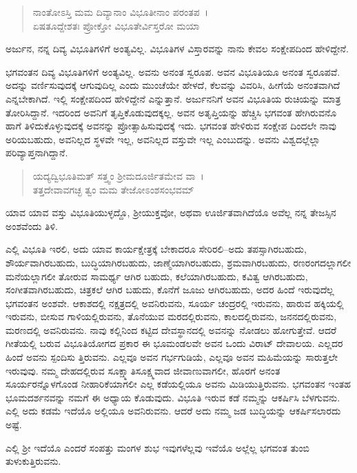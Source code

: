 \begin{verse}
ನಾಂತೋಽಸ್ತಿ ಮಮ ದಿವ್ಯಾನಾಂ ವಿಭೂತೀನಾಂ ಪರಂತಪ~।\\ಏಷತೂದ್ದೇಶತಃ ಪ್ರೋಕ್ತೋ ವಿಭೂತೇರ್ವಿಸ್ತರೋ ಮಯಾ 
\end{verse}

{\small ಅರ್ಜುನ, ನನ್ನ ದಿವ್ಯ ವಿಭೂತಿಗಳಿಗೆ ಅಂತ್ಯವಿಲ್ಲ. ವಿಭೂತಿಗಳ ವಿಸ್ತಾರವನ್ನು ನಾನು ಕೇವಲ ಸಂಕ್ಷೇಪದಿಂದ ಹೇಳಿದ್ದೇನೆ.}

ಭಗವಂತನ ದಿವ್ಯ ವಿಭೂತಿಗಳಿಗೆ ಅಂತ್ಯವಿಲ್ಲ. ಅವನು ಅನಂತ ಸ್ವರೂಪ. ಅವನ ವಿಭೂತಿಯೂ ಅನಂತ ಸ್ವರೂಪವೆ. ಅದನ್ನು ವರ್ಣಿಸುವುದಕ್ಕೆ ಆಗುವುದಿಲ್ಲ ಎಂದು ಮುಂಚೆಯೇ ಹೇಳದೆ, ಕೆಲವನ್ನು ವಿವರಿಸಿ, ಹೀಗೆಯೆ ಅನಂತವಾಗಿದೆ ಎನ್ನಬೇಕಾಗಿದೆ. ಇಲ್ಲಿ ಸಂಕ್ಷೇಪದಿಂದ ಹೇಳಿದ್ದೇನೆ ಎನ್ನುತ್ತಾನೆ. ಅರ್ಜುನನಿಗೆ ಅವನ ವಿಭೂತಿಯ ರುಚಿಯನ್ನು ಮಾತ್ರ ತೋರಿಸಿದ್ದಾನೆ. ಇದರಿಂದ ಅವನಿಗೆ ತೃಪ್ತಿಕೊಡುವುದಕ್ಕಲ್ಲ. ಅವನ ಅತೃಪ್ತಿಯನ್ನು ಹೆಚ್ಚಿಸಿ ಭಗವಂತ ಹೇಗಿರುವನೊ ಹಾಗೆ ತಿಳಿದುಕೊಳ್ಳುವುದಕ್ಕೆ ಅವನನ್ನು ಪ್ರೋತ್ಸಾಹಿಸುವುದಕ್ಕೆ ಇದು. ಭಗವಂತ ಹೇಳಿರುವ ಸಂಕ್ಷೇಪ ದಿಂದಲೇ ನಾವು ಅರಿಯಬಹುದು, ಅವನಿಲ್ಲದ ಸ್ಥಳವೇ ಇಲ್ಲ, ಅವನಿಲ್ಲದ ವಸ್ತುವೇ ಇಲ್ಲ ಎಂಬುದನ್ನು. ಅವನು ವಿಶ್ವದಲ್ಲೆಲ್ಲಾ ಪರಿವ್ಯಾಪ್ತನಾಗಿದ್ದಾನೆ.

\begin{verse}
ಯದ್ಯದ್ವಿಭೂತಿಮತ್ ಸತ್ತ್ವಂ ಶ‍್ರೀಮದೂರ್ಜಿತಮೇವ ವಾ~।\\ತತ್ತದೇವಾವಗಚ್ಛ ತ್ವಂ ಮಮ ತೇಜೋಽಂಶಸಂಭವಮ್ 
\end{verse}

{\small ಯಾವ ಯಾವ ವಸ್ತು ವಿಭೂತಿಯುಳ್ಳದ್ದೊ, ಶ‍್ರೀಯುಕ್ತವೋ, ಅಥವಾ ಊರ್ಜಿತವಾಗಿದೆಯೊ ಅವೆಲ್ಲ ನನ್ನ ತೇಜಸ್ಸಿನ ಅಂಶವೆಂದು ತಿಳಿ.}

ಎಲ್ಲಿ ವಿಭೂತಿ ಇರಲಿ, ಅದು ಯಾವ ಕಾರ್ಯಕ್ಷೇತ್ರಕ್ಕೆ ಬೇಕಾದರೂ ಸೇರಿರಲಿ–ಅದು ತಪಸ್ಸಾಗಿರಬಹುದು, ಶೌರ್ಯವಾಗಿರಬಹುದು, ಬುದ್ಧಿಯಾಗಿರಬಹುದು, ಜಾಣ್ಮೆಯಾಗಿರಬಹುದು, ಶ್ರಮವಾಗಿರಬಹುದು, ರಣರಂಗದಲ್ಲಾಗಲೀ ಮನೆಯಲ್ಲಾಗಲೀ ತೋರುವ ಸಾಮರ್ಥ್ಯ ಆಗಿರ ಬಹುದು, ಕಲೆಯಾಗಿರಬಹುದು, ಕವಿತ್ವ ಆಗಿರಬಹುದು, ಸಂಗೀತವಾಗಿರಬಹುದು, ಚಿತ್ರಕಲೆ ಆಗಿರ ಬಹುದು, ಕೊನೆಗೆ ಜೂಜು ಆಗಿರಬಹುದು, ಅದರ ಹಿಂದೆ ಇರುವುದೆಲ್ಲ ಭಗವಂತನ ಅಂಶವೇ. ಆಕಾಶದಲ್ಲಿ ನಕ್ಷತ್ರದಲ್ಲಿ ಅವನಿರುವನು, ಸೂರ್ಯ ಚಂದ್ರರಲ್ಲಿ ಇರುವನು, ಹಾರುವ ಹಕ್ಕಿಯಲ್ಲಿ ಇರುವನು, ಬೀಸುವ ಗಾಳಿಯಲ್ಲಿರುವನು, ತೊನೆಯುವ ಮರದಲ್ಲಿರುವನು, ಕಾಲದಲ್ಲಿರುವನು, ಜನನದಲ್ಲಿರುವನು, ಮರಣದಲ್ಲಿ ಅವನಿರುವನು. ನಾವು ಕಲ್ಲಿನಿಂದ ಕಟ್ಟಿದ ದೇವಸ್ಥಾನದಲ್ಲಿ ಅವನನ್ನು ನೋಡಲು ಹೋಗುತ್ತೇವೆ. ಆದರೆ ಗೀತೆಯಲ್ಲಿ ಬರುವ ವಿಭೂತಿಯೋಗದ ಪ್ರಕಾರ ಈ ಭೂಮಂಡಲವೇ ಅವನ ಒಂದು ವಿರಾಟ್ ದೇವಾಲಯ. ಎಲ್ಲದರ ಹಿಂದೆ ಅವನು ಸ್ಪಂದಿಸು ತ್ತಿರುವನು. ಎಲ್ಲವೂ ಅವನ ಗರ್ಭಗುಡಿಯೆ, ಎಲ್ಲವೂ ಅವನ ಮಹಿಮೆಯನ್ನು ಸಾರುತ್ತಲೇ ಇರುವುವು. ನಮ್ಮ ದೇಹದಲ್ಲಿರುವ ಸೂಕ್ಷ್ಮಾತಿಸೂಕ್ಷ್ಮವಾದ ಜೀವಾಣುವಾಗಲೀ, ಹೊರಗೆ ಅನಂತ ಸೂರ್ಯರನ್ನೊಳಗೊಂಡ ನೀಹಾರಿಕೆಯಾಗಲೀ ಎಲ್ಲ ಕಡೆಯಲ್ಲಿಯೂ ಅವನು ಮಿಡಿಯುತ್ತಿರುವನು. ಭಗವಂತನ ಇಂತಹ ಭೂಮದರ್ಶನವನ್ನು ನಮಗೆ ಈ ಅಧ್ಯಾಯ ಕೊಡುವುದು. ವಿಭೂತಿ ಇರುವ ಕಡೆ ನಮ್ಮನ್ನು ಆಕರ್ಷಿಸಿ ಬೆಳಗುವನು. ಎಲ್ಲಿ ಅದು ಕಡಮೆ ಇದೆಯೊ ಅಲ್ಲಿಯೂ ಅವನಿರುವನು. ಆದರೆ ಅದು ನಮ್ಮ ಜಡ ಬುದ್ಧಿಯನ್ನು ಆಕರ್ಷಿಸಲಾರದು ಅಷ್ಟೆ.

ಎಲ್ಲಿ ಶ‍್ರೀ ಇದೆಯೊ ಎಂದರೆ ಸಂಪತ್ತು ಮಂಗಳ ಶುಭ ಇವುಗಳೆಲ್ಲವು ಇವೆಯೊ ಅಲ್ಲೆಲ್ಲ ಭಗವಂತ ತುಂಬಿ ತುಳುಕುತ್ತಿರುವನು.

